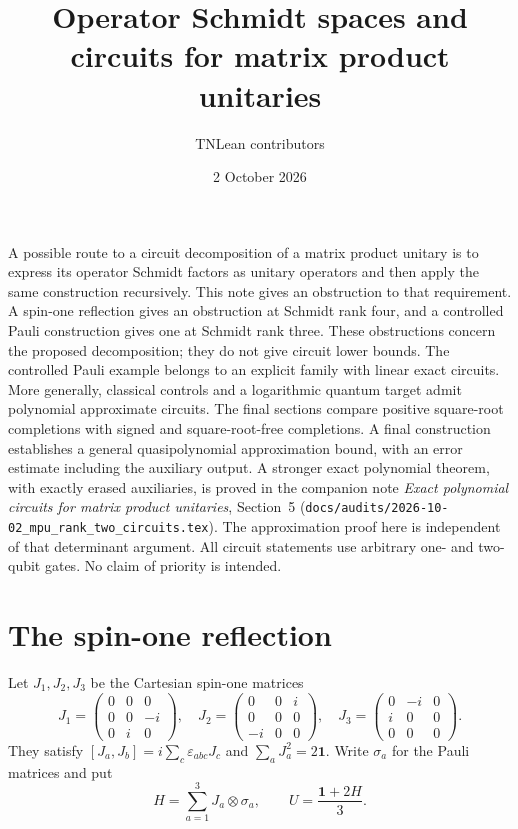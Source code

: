\documentclass[11pt]{article}
\title{Operator Schmidt spaces and circuits for matrix product unitaries}
\author{TNLean contributors}
\date{2 October 2026}
\newcommand{\id}{\mathbf 1}
\begin{document}
\maketitle

A possible route to a circuit decomposition of a matrix product unitary is
to express its operator Schmidt factors as unitary operators and then
apply the same construction recursively. This note gives an obstruction
to that requirement. A spin-one reflection gives an obstruction at Schmidt
rank four, and a controlled Pauli construction gives one at Schmidt rank three.
These obstructions concern the proposed decomposition; they do not give
circuit lower bounds. The controlled Pauli example belongs to an explicit
family with linear exact circuits. More generally, classical controls
and a logarithmic quantum target admit polynomial approximate circuits.
The final sections compare positive square-root completions with signed
and square-root-free completions. A final construction establishes a
general quasipolynomial approximation bound, with an error estimate
including the auxiliary output. A stronger exact polynomial theorem,
with exactly erased auxiliaries, is proved in the companion note
\emph{Exact polynomial circuits for matrix product unitaries}, Section~5
(\nolinkurl{docs/audits/2026-10-02_mpu_rank_two_circuits.tex}).
The approximation proof here is independent of that determinant argument.
All circuit statements use arbitrary one- and two-qubit gates.
No claim of priority is intended.

\section{The spin-one reflection}

Let $J_1,J_2,J_3$ be the Cartesian spin-one matrices
\[
 J_1=\begin{pmatrix}0&0&0\\0&0&-i\\0&i&0\end{pmatrix},\quad
 J_2=\begin{pmatrix}0&0&i\\0&0&0\\-i&0&0\end{pmatrix},\quad
 J_3=\begin{pmatrix}0&-i&0\\i&0&0\\0&0&0\end{pmatrix}.
\]
They satisfy $[J_a,J_b]=i\sum_c\varepsilon_{abc}J_c$ and
$\sum_aJ_a^2=2\id$. Write $\sigma_a$ for the Pauli matrices and put
\[
 H=\sum_{a=1}^3J_a\otimes\sigma_a,
 \qquad U=\frac{\id+2H}{3}.
\]
\end{document}
